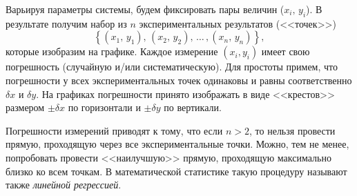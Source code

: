 \documentclass[10pt]{article}
\begin{document}
Варьируя параметры системы, будем фиксировать пары величин ($x_{i},\,y_{i}$).
В результате получим набор из $n$ экспериментальных результатов (<<точек>>)
\[
\left\{ (x_{1},\,y_{1}),\,(x_{2},\,y_{2}),\,\ldots\,,(x_{n},\,y_{n})\right\} ,
\]
которые изобразим на графике. Каждое измерение $\left(x_{i},y_{i}\right)$
имеет свою погрешность (случайную и/или систематическую). Для простоты
примем, что погрешности у всех экспериментальных точек одинаковы и
равны соответственно $\delta x$ и $\delta y$. На графиках погрешности
принято изображать в виде <<крестов>> размером
$\pm\delta x$ по горизонтали и $\pm\delta y$ по вертикали.

Погрешности измерений приводят к тому, что если $n>2$, то нельзя
провести прямую, проходящую через все экспериментальные точки. Можно,
тем не менее, попробовать провести <<наилучшую>>
прямую, проходящую максимально близко ко всем точкам. В математической
статистике такую процедуру называют также \emph{линейной регрессией}.
\end{document}
